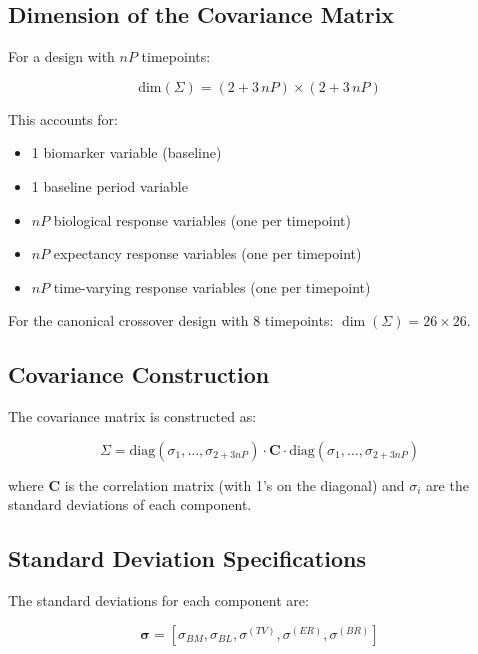 \documentclass[12pt,a4paper]{article}
\begin{document}
\subsection{Dimension of the Covariance Matrix}

For a design with $nP$ timepoints:

\begin{equation}
\text{dim}(\Sigma) = (2 + 3\,nP) \times (2 + 3\,nP)
\end{equation}

This accounts for:
\begin{itemize}
\item 1 biomarker variable (baseline)
\item 1 baseline period variable
\item $nP$ biological response variables (one per timepoint)
\item $nP$ expectancy response variables (one per timepoint)
\item $nP$ time-varying response variables (one per timepoint)
\end{itemize}

For the canonical crossover design with 8 timepoints: $\dim(\Sigma) = 26 \times 26$.

\subsection{Covariance Construction}

The covariance matrix is constructed as:

\begin{equation}
\Sigma = \text{diag}(\sigma_1, \ldots, \sigma_{2+3nP}) \cdot \mathbf{C} \cdot \text{diag}(\sigma_1, \ldots, \sigma_{2+3nP})
\end{equation}

where $\mathbf{C}$ is the correlation matrix (with 1's on the diagonal) and $\sigma_i$ are the standard deviations of each component.

\subsection{Standard Deviation Specifications}

The standard deviations for each component are:

\begin{equation}
\boldsymbol{\sigma} = \left[\sigma_{BM}, \sigma_{BL}, \sigma^{(TV)}, \sigma^{(ER)}, \sigma^{(BR)}\right]
\end{equation}
\end{document}
